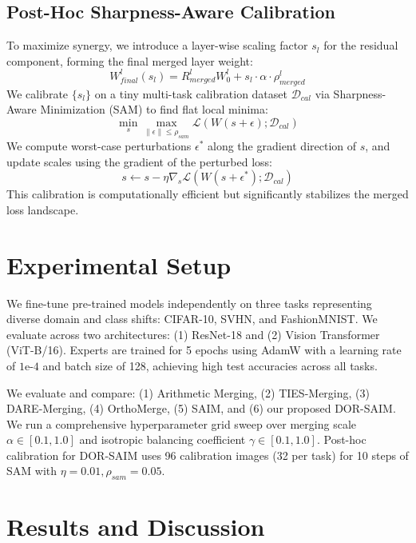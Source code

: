 \documentclass{article}
\begin{document}
\subsection{Post-Hoc Sharpness-Aware Calibration}
To maximize synergy, we introduce a layer-wise scaling factor $s_l$ for the residual component, forming the final merged layer weight:
\begin{equation}
W_{final}^l(s_l) = R_{merged}^l W_0^l + s_l \cdot \alpha \cdot \rho_{merged}^l
\end{equation}
We calibrate $\{s_l\}$ on a tiny multi-task calibration dataset $\mathcal{D}_{cal}$ via Sharpness-Aware Minimization (SAM) to find flat local minima:
\begin{equation}
\min_{s} \max_{\|\epsilon\| \le \rho_{sam}} \mathcal{L}(W(s + \epsilon); \mathcal{D}_{cal})
\end{equation}
We compute worst-case perturbations $\epsilon^*$ along the gradient direction of $s$, and update scales using the gradient of the perturbed loss:
\begin{equation}
s \leftarrow s - \eta \nabla_s \mathcal{L}(W(s + \epsilon^*); \mathcal{D}_{cal})
\end{equation}
This calibration is computationally efficient but significantly stabilizes the merged loss landscape.

\section{Experimental Setup}
\label{sec:experiments}
We fine-tune pre-trained models independently on three tasks representing diverse domain and class shifts: CIFAR-10, SVHN, and FashionMNIST. We evaluate across two architectures: (1) ResNet-18 and (2) Vision Transformer (ViT-B/16). Experts are trained for 5 epochs using AdamW with a learning rate of $1\text{e-4}$ and batch size of 128, achieving high test accuracies across all tasks.

We evaluate and compare: (1) Arithmetic Merging, (2) TIES-Merging, (3) DARE-Merging, (4) OrthoMerge, (5) SAIM, and (6) our proposed DOR-SAIM. We run a comprehensive hyperparameter grid sweep over merging scale $\alpha \in [0.1, 1.0]$ and isotropic balancing coefficient $\gamma \in [0.1, 1.0]$. Post-hoc calibration for DOR-SAIM uses 96 calibration images (32 per task) for 10 steps of SAM with $\eta = 0.01, \rho_{sam} = 0.05$.

\section{Results and Discussion}
\label{sec:results}
\end{document}
